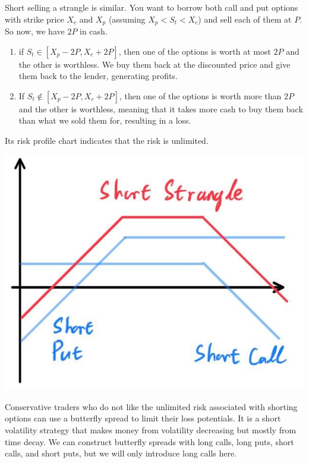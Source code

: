 \documentclass{article}
\begin{document}
  \begin{definition}
  Short selling a strangle is similar. You want to borrow both call and put options with strike price $X_c$ and $X_p$ (assuming $X_p < S_t < X_c$) and sell each of them at $P$. So now, we have $2P$ in cash. 
  \begin{enumerate}
      \item if $S_t \in [X_p - 2P, X_c + 2P]$, then one of the options is worth at most $2P$ and the other is worthless. We buy them back at the discounted price and give them back to the lender, generating profits. 
      
      \item If $S_t \not\in [X_p - 2P, X_c + 2P]$, then one of the options is worth more than $2P$ and the other is worthless, meaning that it takes more cash to buy them back than what we sold them for, resulting in a loss. 
  \end{enumerate}
  Its risk profile chart indicates that the risk is unlimited. 
  \begin{center}
      \includegraphics[scale=0.3]{img/short_strangle.jpg}
  \end{center}
  \end{definition}

  Conservative traders who do not like the unlimited risk associated with shorting options can use a butterfly spread to limit their loss potentials. It is a short volatility strategy that makes money from volatility decreasing but mostly from time decay. We can construct butterfly spreads with long calls, long puts, short calls, and short puts, but we will only introduce long calls here. 
\end{document}

